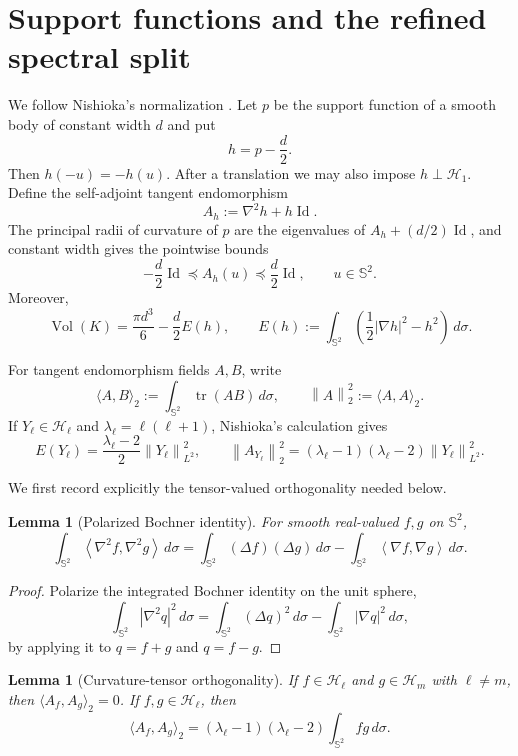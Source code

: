 \documentclass[11pt,reqno]{amsart}
\newtheorem{lemma}[theorem]{Lemma}
\theoremstyle{remark}
\newcommand{\Sph}{\mathbb S^2}
\newcommand{\Harm}{\mathcal H}
\newcommand{\Id}{\operatorname{Id}}
\newcommand{\tr}{\operatorname{tr}}
\newcommand{\Vol}{\operatorname{Vol}}
\newcommand{\dd}{\,d\sigma}
\newcommand{\ip}[2]{\left\langle #1,#2\right\rangle}
\newcommand{\norm}[1]{\left\lVert #1\right\rVert}
\newcommand{\abs}[1]{\left\lvert #1\right\rvert}
\begin{document}
\section{Support functions and the refined spectral split}

We follow Nishioka's normalization \cite{Nishioka2027}. Let $p$ be the support
function of a smooth body of constant width $d$ and put
\[
 h=p-\frac d2.
\]
Then $h(-u)=-h(u)$. After a translation we may also impose
$h\perp\Harm_1$. Define the self-adjoint tangent endomorphism
\[
 A_h:=\nabla^2h+h\Id.
\]
The principal radii of curvature of $p$ are the eigenvalues of
$A_h+(d/2)\Id$, and constant width gives the pointwise bounds
\begin{equation}\label{eq:box}
 -\frac d2\Id\preceq A_h(u)\preceq \frac d2\Id,
 \qquad u\in\Sph.
\end{equation}
Moreover,
\begin{equation}\label{eq:volume}
 \Vol(K)=\frac{\pi d^3}{6}-\frac d2 E(h),
 \qquad
 E(h):=\int_{\Sph}\left(\frac12\abs{\nabla h}^2-h^2\right)\dd.
\end{equation}

For tangent endomorphism fields $A,B$, write
\[
 \langle A,B\rangle_2:=\int_{\Sph}\tr(AB)\dd,
 \qquad \norm{A}_2^2:=\langle A,A\rangle_2.
\]
If $Y_\ell\in\Harm_\ell$ and
$\lambda_\ell=\ell(\ell+1)$, Nishioka's calculation gives
\begin{equation}\label{eq:nishioka-mode}
 E(Y_\ell)=\frac{\lambda_\ell-2}{2}\norm{Y_\ell}_{L^2}^2,
 \qquad
 \norm{A_{Y_\ell}}_2^2
 = (\lambda_\ell-1)(\lambda_\ell-2)\norm{Y_\ell}_{L^2}^2.
\end{equation}

We first record explicitly the tensor-valued orthogonality needed below.

\begin{lemma}[Polarized Bochner identity]\label{lem:polarized-bochner}
For smooth real-valued $f,g$ on $\Sph$,
\[
 \int_{\Sph}\ip{\nabla^2f}{\nabla^2g}\dd
 =\int_{\Sph}(\Delta f)(\Delta g)\dd
 -\int_{\Sph}\ip{\nabla f}{\nabla g}\dd.
\]
\end{lemma}

\begin{proof}
Polarize the integrated Bochner identity on the unit sphere,
\[
 \int_{\Sph}\abs{\nabla^2q}^2\dd
 =\int_{\Sph}(\Delta q)^2\dd
 -\int_{\Sph}\abs{\nabla q}^2\dd,
\]
by applying it to $q=f+g$ and $q=f-g$.
\end{proof}

\begin{lemma}[Curvature-tensor orthogonality]\label{lem:tensor-orth}
If $f\in\Harm_\ell$ and $g\in\Harm_m$ with $\ell\ne m$, then
$\langle A_f,A_g\rangle_2=0$. If $f,g\in\Harm_\ell$, then
\[
 \langle A_f,A_g\rangle_2
 = (\lambda_\ell-1)(\lambda_\ell-2)
   \int_{\Sph}fg\dd.
\]
\end{lemma}
\end{document}
